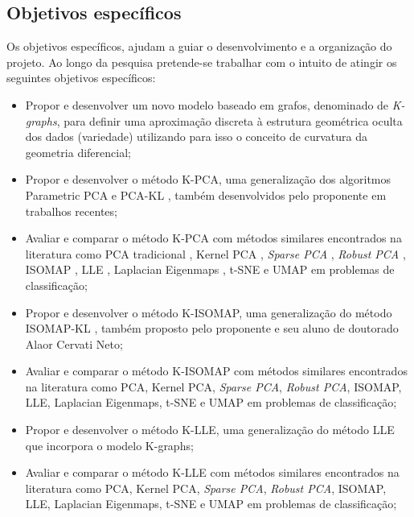 \documentclass[a4paper,12pt]{article}
\begin{document}
\subsection{Objetivos específicos}

Os objetivos específicos, ajudam a guiar o desenvolvimento e a organização do projeto. Ao longo da pesquisa pretende-se trabalhar com o intuito de atingir os seguintes objetivos específicos:

\begin{itemize}
	\item Propor e desenvolver um novo modelo baseado em grafos, denominado de \emph{K-graphs}, para definir uma aproximação discreta à estrutura geométrica oculta dos dados (variedade) utilizando para isso o conceito de curvatura da geometria diferencial;
	\item Propor e desenvolver o método K-PCA, uma generalização dos algoritmos Parametric PCA \cite{PPCA} e PCA-KL \cite{PCAKL}, também desenvolvidos pelo proponente em trabalhos recentes;
	\item Avaliar e comparar o método K-PCA com métodos similares encontrados na literatura como PCA tradicional \cite{PCA}, Kernel PCA \cite{KPCA}, \textit{Sparse PCA} \cite{SparsePCA2006}, \textit{Robust PCA} \cite{RobustPCA}, ISOMAP \cite{Isomap}, LLE \cite{LLE}, Laplacian Eigenmaps \cite{LapEig}, t-SNE \cite{tSNE} e UMAP \cite{UMAP} em problemas de classificação;
	\item Propor e desenvolver o método K-ISOMAP, uma generalização do método ISOMAP-KL \cite{ISOKL}, também proposto pelo proponente e seu aluno de doutorado Alaor Cervati Neto;
	\item Avaliar e comparar o método K-ISOMAP com métodos similares encontrados na literatura como PCA, Kernel PCA, \textit{Sparse PCA}, \textit{Robust PCA}, ISOMAP, LLE, Laplacian Eigenmaps, t-SNE e UMAP em problemas de classificação;
	\item Propor e desenvolver o método K-LLE, uma generalização do método LLE que incorpora o modelo K-graphs;
	\item Avaliar e comparar o método K-LLE com métodos similares encontrados na literatura como PCA, Kernel PCA, \textit{Sparse PCA}, \textit{Robust PCA}, ISOMAP, LLE, Laplacian Eigenmaps, t-SNE e UMAP em problemas de classificação;		
\end{itemize}
\end{document}
